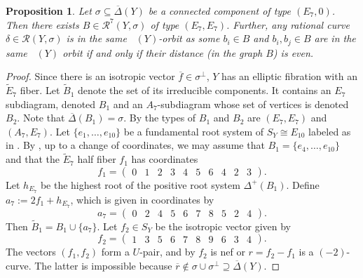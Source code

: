 \documentclass[a4paper]{amsart}
\theoremstyle{definition}
\theoremstyle{plain}
\newtheorem{proposition}[definition]{Proposition}
\DeclareMathOperator{\aut}{Aut^*}
\newcommand{\R}{\mathcal{R}}
\newcommand{\DeltabarY}{\overline{\Delta}(Y)}
\begin{document}
\begin{proposition}\label{lem:AutOrbitE7E7}
Let $\sigma \subseteq \DeltabarY$ be a connected component of type $(E_7, 0)$.
Then there exists $B \in \R^7(Y,\sigma)$ of type $(E_7,E_7)$. Further, any rational curve $\delta \in \R(Y,\sigma)$ is in the same $\aut(Y)$-orbit as some $b_i \in B$ and $b_i, b_j \in B$ are in the same $\aut(Y)$ orbit if and only if their distance (in the graph $B$) is even.
\end{proposition}
\begin{proof}
Since there is an isotropic vector $\overline{f} \in \sigma^\perp$, $Y$ has an elliptic fibration with an $\widetilde{E}_7$ fiber. Let $\widetilde{B}_1$ denote the set of its irreducible components.
It contains an $E_7$ subdiagram, denoted $B_1$ and an $A_7$-subdiagram whose set of vertices is denoted $B_2$. Note that $\overline{\Delta}(B_1)=\sigma$.
By  the types of $B_1$ and $B_2$ are $(E_7,E_7)$ and $(A_7,E_7)$.
Let $\{e_1,\dots, e_{10}\}$ be a fundamental root system of $S_Y \cong E_{10}$ labeled as in .
By , up to a change of coordinates, we may assume that $B_1=\{e_4,\dots, e_{10}\}$
and that the $\widetilde{E}_7$ half fiber $f_1$ has coordinates
\[f_1 = \begin{pmatrix}
0&1&2&3&4&5&6&4&2&3
\end{pmatrix}.\]
Let $h_{E_7}$ be the highest root of the positive root system $\Delta^+(B_1)$. Define $a_7:= 2 f_1 + h_{E_7}$,
which is given in coordinates by
\[a_7 =\begin{pmatrix}
0& 2& 4& 5& 6& 7& 8& 5& 2& 4
\end{pmatrix}.\]
Then $\widetilde{B}_1 = B_1 \cup \{a_7\}$.
Let $f_2 \in S_Y$ be the isotropic vector given by
\[f_2 = \begin{pmatrix}
    1&3&5&6&7&8&9&6&3&4
\end{pmatrix}.\]
The vectors $(f_1,f_2)$ form a $U$-pair, and by  $f_2$ is nef or $r=f_2-f_1$ is a $(-2)$-curve. The latter is impossible because $\overline{r}\notin \sigma \cup \sigma^\perp \supseteq \DeltabarY$.


\end{proof}
\end{document}
